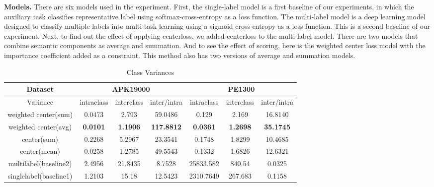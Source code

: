 \textbf{Models. }
There are six models used in the experiment. First, the single-label model is a first baseline of our experiments, in which the auxiliary task classifies representative label using softmax-cross-entropy as a loss function. The multi-label model is a deep learning model designed to classify multiple labels into multi-task learning using a sigmoid cross-entropy as a loss function. This is a second baseline of our experiment. Next, to find out the effect of applying centerloss, we added centerloss to the multi-label model. There are two models that combine semantic components as average and summation. And to see the effect of scoring, here is the weighted center loss model with the importance coefficient added as a constraint. This method also has two versions of average and summation models.
  

\begin{table*}[!htb]%
\caption{Class Variances}
\label{tab:class_variances}
\begin{minipage}{\textwidth}
\begin{center}
\begin{tabular}{|c|c|c|c|c|c|c|}
\hline
Dataset             & \multicolumn{3}{c|}{APK19000}                               & \multicolumn{3}{c|}{PE1300}                                             \\ \hline
Variance              & intraclass  & interclass  & inter/intra & intraclass  & interclass  & inter/intra  \\ \hline
weighted center(sum)  & 0.0473              &         2.793       &     59.0486             & 0.129               &              2.169 &              16.8140    \\ \hline
weighted center(avg) & \textbf{0.0101}              &          \textbf{    1.1906} &    \textbf{117.8812 }            & \textbf{0.0361             } &                   \textbf{ 1.2698} &      \textbf{35.1745}                   \\ \hline
center(sum)         & 0.2268              &                    5.2967 &          23.3541               & 0.1748              &              1.8299       &    10.4685                     \\ \hline
center(mean)        & 0.0258              &                    1.2785 &           49.5543              & 0.1332              &        1.6826             &     12.6321                    \\ \hline
multilabel(baseline2)               & 2.4956              &                    21.8435 &       8.7528                    & 25833.582           &        840.54             &        0.0325               \\ \hline
singlelabel(baseline1)              & 1.2103              &                    15.18 &            12.5423             & 2310.7649           &      267.683               &           0.1158              \\ \hline
\end{tabular}
\end{center}
\bigskip\centering
\end{minipage}
\end{table*}%


